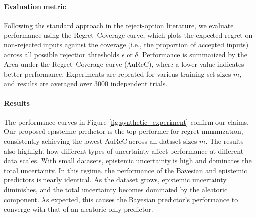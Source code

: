 
\paragraph{Evaluation metric} Following the standard approach in the reject-option literature, we evaluate performance using the Regret–Coverage curve, which plots the expected regret on non-rejected inputs against the coverage (i.e., the proportion of accepted inputs) across all possible rejection thresholds $\epsilon$ or $\delta$. Performance is summarized by the Area under the Regret–Coverage curve (AuReC), where a lower value indicates better performance. 
Experiments are repeated for various training set sizes $m$, and results are averaged over 3000 independent trials.


\paragraph{Results}
The performance curves in Figure \ref{fig:synthetic_experiment} confirm our claims. Our proposed epistemic predictor is the top performer for regret minimization, consistently achieving the lowest AuReC across all dataset sizes $m$. The results also highlight how different types of uncertainty affect performance at different data scales. With small datasets, epistemic uncertainty is high and dominates the total uncertainty. In this regime, the performance of the Bayesian and epistemic predictors is nearly identical. As the dataset grows, epistemic uncertainty diminishes, and the total uncertainty becomes dominated by the aleatoric component. As expected, this causes the Bayesian predictor's performance to converge with that of an aleatoric-only predictor.

